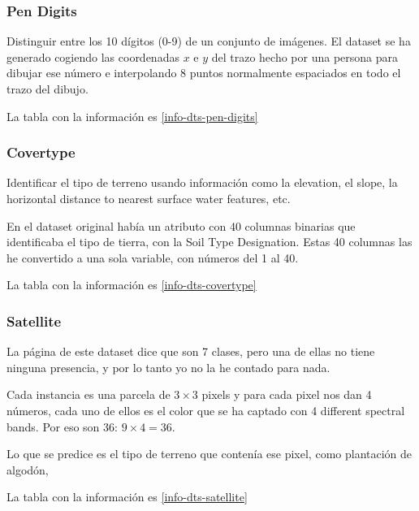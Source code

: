
\subsubsection{Pen Digits}
\cite[See][]{pen-digits}

Distinguir entre los 10 dígitos (0-9) de un conjunto de imágenes. El dataset
se ha generado cogiendo las coordenadas $x$ e $y$ del trazo hecho por una
persona para dibujar ese número e interpolando 8 puntos normalmente espaciados
en todo el trazo del dibujo.

La tabla con la información es \ref{info-dts-pen-digits}


\subsubsection{Covertype}
\cite[See][]{covertype}

Identificar el tipo de terreno usando información como la elevation, el slope,
la horizontal distance to nearest surface water features, etc.

En el dataset original había un atributo con 40 columnas binarias que
identificaba el tipo de tierra, con la Soil Type Designation. Estas 40
columnas las he convertido a una sola variable, con números del 1 al 40.

La tabla con la información es \ref{info-dts-covertype}



\subsubsection{Satellite}
\cite[See][]{satellite}

La página de este dataset dice que son 7 clases, pero una de ellas no tiene
ninguna presencia, y por lo tanto yo no la he contado para nada.

Cada instancia es una parcela de $3 \times 3$ pixels y para cada pixel nos
dan 4 números, cada uno de ellos es el color que se ha captado con 4
different spectral bands. Por eso son 36: $9 \times 4 = 36$.

Lo que se predice es el tipo de terreno que contenía ese pixel, como plantación
de algodón,

La tabla con la información es \ref{info-dts-satellite}

